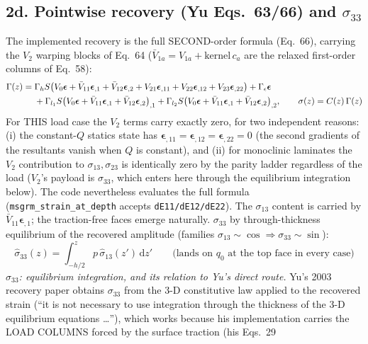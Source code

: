 \documentclass[11pt]{article}
\newcommand{\code}[1]{\texttt{#1}}
\begin{document}
\subsection*{2d.  Pointwise recovery (Yu Eqs.~63/66) and $\sigma_{33}$}
The implemented recovery is the full SECOND-order formula (Eq.~66), carrying the
$V_2$ warping blocks of Eq.~64 ($\bar V_{1a} = V_{1a} + \mathrm{kernel}\,c_a$ are the
relaxed first-order columns of Eq.~58):
\begin{align}
\Gamma(z) ={}& \Gamma_h S\big(V_0\bm\epsilon + \bar V_{11}\bm\epsilon_{,1}
 + \bar V_{12}\bm\epsilon_{,2}
 + V_{21}\bm\epsilon_{,11} + V_{22}\bm\epsilon_{,12} + V_{23}\bm\epsilon_{,22}\big)
 + \Gamma_\epsilon\bm\epsilon \notag\\
 &+ \Gamma_{l_1}S\big(V_0\bm\epsilon + \bar V_{11}\bm\epsilon_{,1}
 + \bar V_{12}\bm\epsilon_{,2}\big)_{,1}
 + \Gamma_{l_2}S\big(V_0\bm\epsilon + \bar V_{11}\bm\epsilon_{,1}
 + \bar V_{12}\bm\epsilon_{,2}\big)_{,2},
\qquad \sigma(z) = C(z)\,\Gamma(z)
\end{align}
For THIS load case the $V_2$ terms carry exactly zero, for two independent reasons:
(i) the constant-$Q$ statics state has $\bm\epsilon_{,11} = \bm\epsilon_{,12} =
\bm\epsilon_{,22} = 0$ (the second gradients of the resultants vanish when $Q$ is
constant), and (ii) for monoclinic laminates the $V_2$ contribution to
$\sigma_{13},\sigma_{23}$ is identically zero by the parity ladder regardless of the
load ($V_2$'s payload is $\sigma_{33}$, which enters here through the equilibrium
integration below).  The code nevertheless evaluates the full formula
(\code{msgrm\_strain\_at\_depth} accepts \code{dE11/dE12/dE22}).
The $\sigma_{13}$ content is carried by $\bar V_{11}\bm\epsilon_{,1}$; the
traction-free faces emerge naturally.  $\sigma_{33}$ by through-thickness equilibrium
of the recovered amplitude (families $\sigma_{13}\sim\cos \Rightarrow
\sigma_{33}\sim\sin$):
\begin{equation}
\hat\sigma_{33}(z) = \int_{-h/2}^{z} p\,\hat\sigma_{13}(z')\,\mathrm dz'
\qquad\text{(lands on } q_0 \text{ at the top face in every case)}
\end{equation}
\emph{$\sigma_{33}$: equilibrium integration, and its relation to Yu's direct route.}
Yu's 2003 recovery paper obtains $\sigma_{33}$ from the 3-D constitutive law applied
to the recovered strain (``it is not necessary to use integration through the
thickness of the 3-D equilibrium equations \dots''), which works because his
implementation carries the LOAD COLUMNS forced by the surface traction (his Eqs.~29
\end{document}

